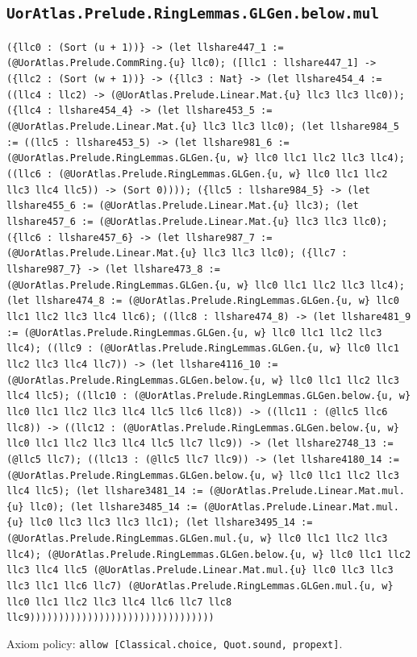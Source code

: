 \documentclass[11pt]{article}
\begin{document}
\subsection*{\texttt{UorAtlas.Prelude.RingLemmas.GLGen.below.mul}}
\noindent\texttt{(\{llc0 : (Sort (u + 1))\} -> (let llshare447\_1 := (@UorAtlas.Prelude.CommRing.\{u\} llc0); ([llc1 : llshare447\_1] -> (\{llc2 : (Sort (w + 1))\} -> (\{llc3 : Nat\} -> (let llshare454\_4 := ((llc4 : llc2) -> (@UorAtlas.Prelude.Linear.Mat.\{u\} llc3 llc3 llc0)); (\{llc4 : llshare454\_4\} -> (let llshare453\_5 := (@UorAtlas.Prelude.Linear.Mat.\{u\} llc3 llc3 llc0); (let llshare984\_5 := ((llc5 : llshare453\_5) -> (let llshare981\_6 := (@UorAtlas.Prelude.RingLemmas.GLGen.\{u, w\} llc0 llc1 llc2 llc3 llc4); ((llc6 : (@UorAtlas.Prelude.RingLemmas.GLGen.\{u, w\} llc0 llc1 llc2 llc3 llc4 llc5)) -> (Sort 0)))); (\{llc5 : llshare984\_5\} -> (let llshare455\_6 := (@UorAtlas.Prelude.Linear.Mat.\{u\} llc3); (let llshare457\_6 := (@UorAtlas.Prelude.Linear.Mat.\{u\} llc3 llc3 llc0); (\{llc6 : llshare457\_6\} -> (let llshare987\_7 := (@UorAtlas.Prelude.Linear.Mat.\{u\} llc3 llc3 llc0); (\{llc7 : llshare987\_7\} -> (let llshare473\_8 := (@UorAtlas.Prelude.RingLemmas.GLGen.\{u, w\} llc0 llc1 llc2 llc3 llc4); (let llshare474\_8 := (@UorAtlas.Prelude.RingLemmas.GLGen.\{u, w\} llc0 llc1 llc2 llc3 llc4 llc6); ((llc8 : llshare474\_8) -> (let llshare481\_9 := (@UorAtlas.Prelude.RingLemmas.GLGen.\{u, w\} llc0 llc1 llc2 llc3 llc4); ((llc9 : (@UorAtlas.Prelude.RingLemmas.GLGen.\{u, w\} llc0 llc1 llc2 llc3 llc4 llc7)) -> (let llshare4116\_10 := (@UorAtlas.Prelude.RingLemmas.GLGen.below.\{u, w\} llc0 llc1 llc2 llc3 llc4 llc5); ((llc10 : (@UorAtlas.Prelude.RingLemmas.GLGen.below.\{u, w\} llc0 llc1 llc2 llc3 llc4 llc5 llc6 llc8)) -> ((llc11 : (@llc5 llc6 llc8)) -> ((llc12 : (@UorAtlas.Prelude.RingLemmas.GLGen.below.\{u, w\} llc0 llc1 llc2 llc3 llc4 llc5 llc7 llc9)) -> (let llshare2748\_13 := (@llc5 llc7); ((llc13 : (@llc5 llc7 llc9)) -> (let llshare4180\_14 := (@UorAtlas.Prelude.RingLemmas.GLGen.below.\{u, w\} llc0 llc1 llc2 llc3 llc4 llc5); (let llshare3481\_14 := (@UorAtlas.Prelude.Linear.Mat.mul.\{u\} llc0); (let llshare3485\_14 := (@UorAtlas.Prelude.Linear.Mat.mul.\{u\} llc0 llc3 llc3 llc3 llc1); (let llshare3495\_14 := (@UorAtlas.Prelude.RingLemmas.GLGen.mul.\{u, w\} llc0 llc1 llc2 llc3 llc4); (@UorAtlas.Prelude.RingLemmas.GLGen.below.\{u, w\} llc0 llc1 llc2 llc3 llc4 llc5 (@UorAtlas.Prelude.Linear.Mat.mul.\{u\} llc0 llc3 llc3 llc3 llc1 llc6 llc7) (@UorAtlas.Prelude.RingLemmas.GLGen.mul.\{u, w\} llc0 llc1 llc2 llc3 llc4 llc6 llc7 llc8 llc9))))))))))))))))))))))))))))))))}\par
\noindent Axiom policy: \texttt{allow [Classical.choice, Quot.sound, propext]}.\par
\end{document}
